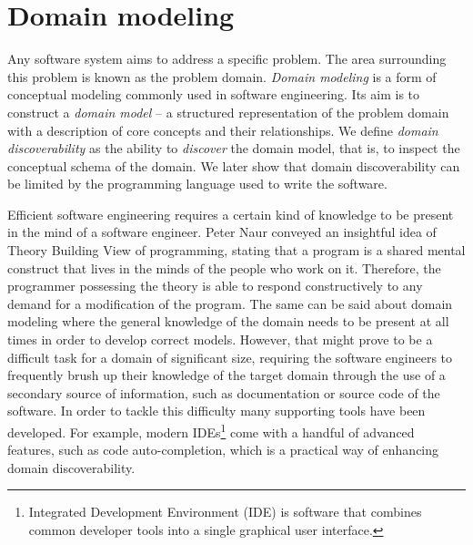 \section{Domain modeling}
Any software system aims to address a specific problem.
The area surrounding this problem is known as the problem domain. \textit{Domain modeling} is a form of conceptual modeling commonly used in software engineering.
Its aim is to construct a \textit{domain model} -- a structured representation of the problem domain with a description of core concepts and their relationships.
We define \textit{domain discoverability} as the ability to \textit{discover} the domain model, that is, to inspect the conceptual schema of the domain.
We later show that domain discoverability can be limited by the programming language used to write the software.

\n

Efficient software engineering requires a certain kind of knowledge to be present in the mind of a software engineer. 
Peter Naur \cite{naur} conveyed an insightful idea of Theory Building View of programming, stating that a program is a shared mental construct that lives in the minds of the people who work on it.
Therefore, the programmer possessing the theory is able to respond constructively to any demand for a modification of the program.
The same can be said about domain modeling where the general knowledge of the domain needs to be present at all times in order to develop correct models.
However, that might prove to be a difficult task for a domain of significant size, requiring the software engineers to frequently brush up their knowledge of the target domain through the use of a secondary source of information, such as documentation or source code of the software.
In order to tackle this difficulty many supporting tools have been developed. For example, modern IDEs\footnote{Integrated Development Environment (IDE) is software that combines common developer tools into a single graphical user interface.} come with a handful of advanced features, such as code auto-completion, which is a practical way of enhancing domain discoverability.

\n

